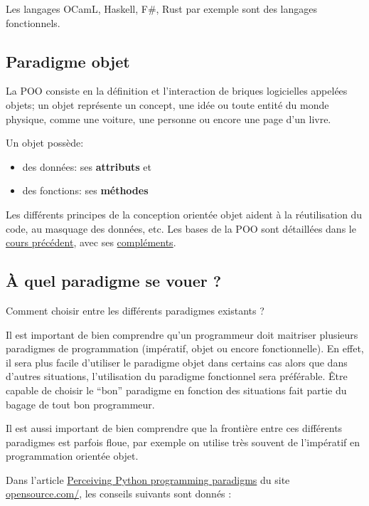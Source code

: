 \documentclass[
  letterpaper,
  DIV=11,
  numbers=noendperiod]{scrartcl}
\providecommand{\tightlist}{%
  \setlength{\itemsep}{0pt}\setlength{\parskip}{0pt}}\usepackage{longtable,booktabs,array}
\begin{document}
Les langages OCamL, Haskell, F\#, Rust par exemple sont des langages
fonctionnels.

\hypertarget{paradigme-objet}{%
\subsection{Paradigme objet}\label{paradigme-objet}}

La POO consiste en la définition et l'interaction de briques logicielles
appelées objets; un objet représente un concept, une idée ou toute
entité du monde physique, comme une voiture, une personne ou encore une
page d'un livre.

Un objet possède:

\begin{itemize}
\tightlist
\item
  des données: ses \textbf{attributs} et
\item
  des fonctions: ses \textbf{méthodes}
\end{itemize}

Les différents principes de la conception orientée objet aident à la
réutilisation du code, au masquage des données, etc. Les bases de la POO
sont détaillées dans le \href{POO_cours.qmd}{cours précédent}, avec ses
\href{POO_complements.qmd}{compléments}.

\hypertarget{uxe0-quel-paradigme-se-vouer}{%
\subsection{À quel paradigme se vouer
?}\label{uxe0-quel-paradigme-se-vouer}}

Comment choisir entre les différents paradigmes existants ?

Il est important de bien comprendre qu'un programmeur doit maitriser
plusieurs paradigmes de programmation (impératif, objet ou encore
fonctionnelle). En effet, il sera plus facile d'utiliser le paradigme
objet dans certains cas alors que dans d'autres situations,
l'utilisation du paradigme fonctionnel sera préférable. Être capable de
choisir le ``bon'' paradigme en fonction des situations fait partie du
bagage de tout bon programmeur.

Il est aussi important de bien comprendre que la frontière entre ces
différents paradigmes est parfois floue, par exemple on utilise très
souvent de l'impératif en programmation orientée objet.

Dans l'article
\href{https://opensource.com/article/19/10/python-programming-paradigms}{Perceiving
Python programming paradigms} du site
\href{https://opensource.com/}{opensource.com/}, les conseils suivants
sont donnés :
\end{document}

